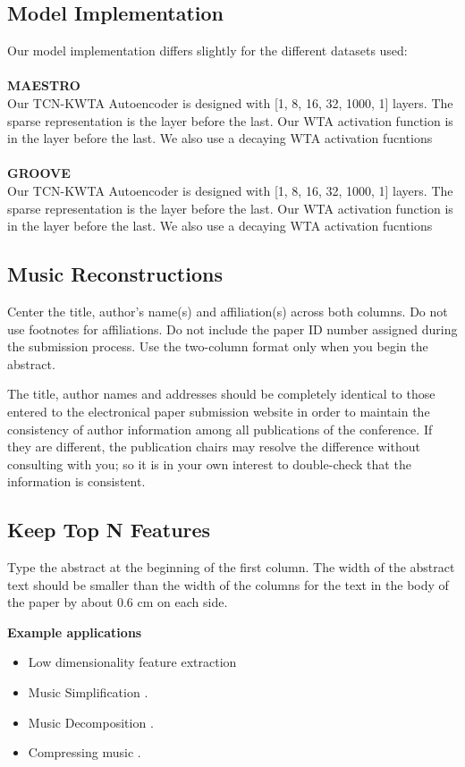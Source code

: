 \documentclass[11pt,a4paper]{article}
\begin{document}
\subsection{Model Implementation}
Our model implementation differs slightly for the different datasets used: 
\\
\\
\textbf{MAESTRO} 
\\
Our TCN-KWTA Autoencoder is designed with [1, 8, 16, 32, 1000, 1] layers. The sparse representation is the layer before the last. Our WTA activation function is in the layer before the last. We also use a decaying WTA activation fucntions
\\
\\
\textbf{GROOVE} 
\\
Our TCN-KWTA Autoencoder is designed with [1, 8, 16, 32, 1000, 1] layers. The sparse representation is the layer before the last. Our WTA activation function is in the layer before the last. We also use a decaying WTA activation fucntions


\subsection{Music Reconstructions}
\label{ssec:first}

Center the title, author's name(s) and affiliation(s) across both
columns. Do not use footnotes for affiliations. Do not include the
paper ID number assigned during the submission process. Use the
two-column format only when you begin the abstract.

The title, author names and addresses should be completely identical
to those entered to the electronical paper submission website in order
to maintain the consistency of author information among all
publications of the conference. If they are different, the publication
chairs may resolve the difference without consulting with you; so it
is in your own interest to double-check that the information is
consistent.

\subsection{Keep Top N Features }

Type the abstract at the beginning of the first
column. The width of the abstract text should be smaller than the
width of the columns for the text in the body of the paper by about
0.6 cm on each side. 

\textbf{Example applications} 
\begin{itemize}
\item Low dimensionality feature extraction 
\item Music Simplification \cite{Ando2005}.
\item Music Decomposition \cite{Ando2005}.
\item Compressing music \cite{borsch2011}.
\end{itemize}
\end{document}
